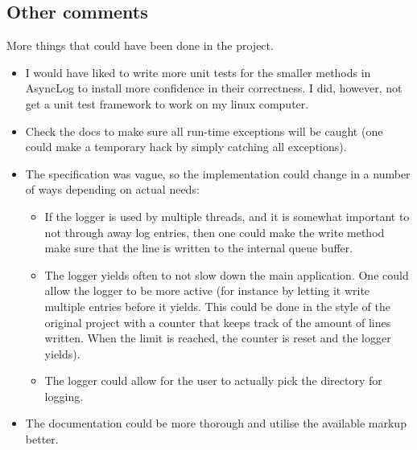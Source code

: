 \documentclass{article}
\begin{document}
\subsection*{Other comments}
More things that could have been done in the project.
\begin{itemize}
\item I would have liked to write more unit tests for the smaller methods in AsyncLog to install more confidence in their correctness. I did, however, not get a unit test framework to work on my linux computer.
\item Check the docs to make sure all run-time exceptions will be caught (one could make a temporary hack by simply catching all exceptions).
\item The specification was vague, so the implementation could change in a number of ways depending on actual needs:
  \begin{itemize}
  \item If the logger is used by multiple threads, and it is somewhat important to not through away log entries, then one could make the write method make sure that the line is written to the internal queue buffer.
  \item The logger yields often to not slow down the main application. One could allow the logger to be more active (for instance by letting it write multiple entries before it yields. This could be done in the style of the original project with a counter that keeps track of the amount of lines written. When the limit is reached, the counter is reset and the logger yields).
  \item The logger could allow for the user to actually pick the directory for logging.
  \end{itemize}
\item The documentation could be more thorough and utilise the available markup better.
\end{itemize}
\end{document}
